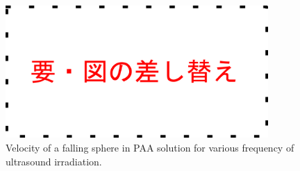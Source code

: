 \begin{figure}[h]
    \centering
    \includegraphics[width=10cm,clip]{tmp.png}
    \caption{Velocity of a falling sphere in PAA solution for various frequency of
        ultrasound irradiation.}
    \label{fig:PAA-falling}
\end{figure}
